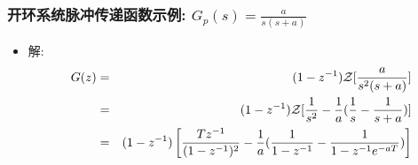 \documentclass[table]{beamer}
\begin{document}
\begin{frame}
\frametitle{开环系统脉冲传递函数示例:  $G_p(s)=\frac{a}{s(s+a)}$}
\label{sec-4-3-4}

\begin{itemize}
\item <2->解:
      \begin{eqnarray*}
      G(z) & = &(1-z^{-1}){\cal Z}[\frac{a}{s^2(s+a)}] \\
       &=& (1-z^{-1}){\cal Z}[\frac{1}{s^2}-\frac{1}{a}(\frac{1}{s}-\frac{1}{s+a})] \\
       &=& (1-z^{-1})\left[\frac{Tz^{-1}}{(1-z^{-1})^2}-\frac{1}{a}(\frac{1}{1-z^{-1}}-\frac{1}{1-z^{-1}e^{-aT}} )\right]
      \end{eqnarray*}
\end{itemize}
\end{frame}
\end{document}
